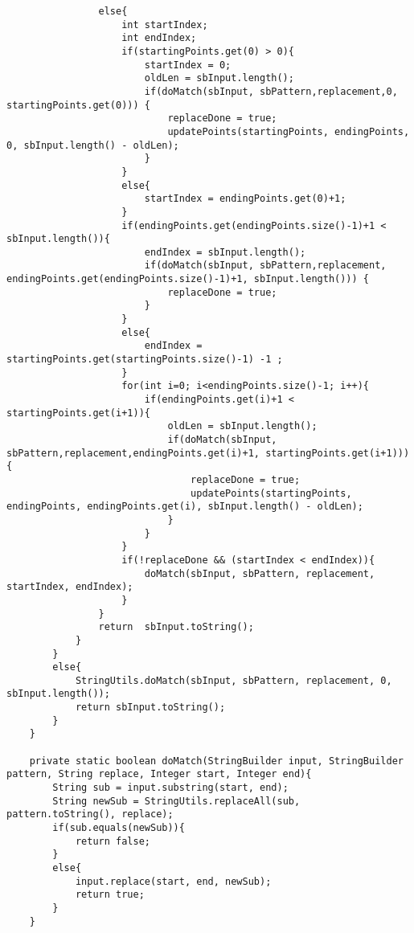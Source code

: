 \documentclass{article}
\begin{document}
\begin{lstlisting}
                else{
                    int startIndex;
                    int endIndex;
                    if(startingPoints.get(0) > 0){
                        startIndex = 0;
                        oldLen = sbInput.length();
                        if(doMatch(sbInput, sbPattern,replacement,0, startingPoints.get(0))) {
                            replaceDone = true;
                            updatePoints(startingPoints, endingPoints, 0, sbInput.length() - oldLen);
                        }
                    }
                    else{
                        startIndex = endingPoints.get(0)+1;
                    }
                    if(endingPoints.get(endingPoints.size()-1)+1 < sbInput.length()){
                        endIndex = sbInput.length();
                        if(doMatch(sbInput, sbPattern,replacement, endingPoints.get(endingPoints.size()-1)+1, sbInput.length())) {
                            replaceDone = true;
                        }
                    }
                    else{
                        endIndex = startingPoints.get(startingPoints.size()-1) -1 ;
                    }
                    for(int i=0; i<endingPoints.size()-1; i++){
                        if(endingPoints.get(i)+1 < startingPoints.get(i+1)){
                            oldLen = sbInput.length();
                            if(doMatch(sbInput, sbPattern,replacement,endingPoints.get(i)+1, startingPoints.get(i+1))){
                                replaceDone = true;
                                updatePoints(startingPoints, endingPoints, endingPoints.get(i), sbInput.length() - oldLen);
                            }
                        }
                    }
                    if(!replaceDone && (startIndex < endIndex)){
                        doMatch(sbInput, sbPattern, replacement, startIndex, endIndex);
                    }
                }
                return  sbInput.toString();
            }
        }
        else{
            StringUtils.doMatch(sbInput, sbPattern, replacement, 0, sbInput.length());
            return sbInput.toString();
        }
    }

    private static boolean doMatch(StringBuilder input, StringBuilder pattern, String replace, Integer start, Integer end){
        String sub = input.substring(start, end);
        String newSub = StringUtils.replaceAll(sub, pattern.toString(), replace);
        if(sub.equals(newSub)){
            return false;
        }
        else{
            input.replace(start, end, newSub);
            return true;
        }
    }


\end{lstlisting}
\end{document}
